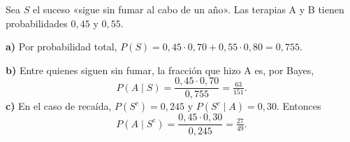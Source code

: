 Sea $S$ el suceso «sigue sin fumar al cabo de un año». Las terapias A y B tienen probabilidades $0{,}45$ y $0{,}55$.

\textbf{a)} Por probabilidad total, $P(S)=0{,}45\cdot0{,}70+0{,}55\cdot0{,}80=\boxed{0{,}755}$.

\textbf{b)} Entre quienes siguen sin fumar, la fracción que hizo A es, por Bayes,
\[
P(A\mid S)=\frac{0{,}45\cdot0{,}70}{0{,}755}=\boxed{\tfrac{63}{151}}.
\]
\textbf{c)} En el caso de recaída, $P(S^c)=0{,}245$ y $P(S^c\mid A)=0{,}30$. Entonces
\[
P(A\mid S^c)=\frac{0{,}45\cdot0{,}30}{0{,}245}=\boxed{\tfrac{27}{49}}.
\]
